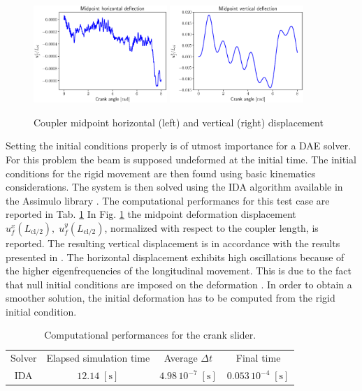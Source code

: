 \documentclass{svjour3}                     %
\newcommand{\secondRev}[1]{\textcolor{blue!80!black}{#1}}
\begin{document}
	
	\begin{figure}[tb]
		\centering
		\includegraphics[width=0.45\textwidth]{uM_disp.eps} 
		\includegraphics[width=0.45\textwidth]{wM_disp.eps} 
		\caption{Coupler midpoint horizontal (left) and vertical (right) displacement}
		\label{fig:defM_crsl}
	\end{figure}
	
	Setting the initial conditions properly is of utmost  importance for a DAE solver. For this problem the beam is supposed undeformed at the initial time. The initial conditions for the rigid movement are then found using basic kinematics considerations.  The system is then solved using the IDA algorithm available in the Assimulo library \cite{assimulo}. \secondRev{The computational performancs for this test case are reported in Tab. \ref{tab:comp_perf_crslider}} In Fig. \ref{fig:defM_crsl} the midpoint deformation displacement $u_f^x(L_{\text{cl}/2}),\; u_f^y(L_{\text{cl}/2})$, normalized with respect to the coupler length, is reported. The resulting vertical displacement is in accordance with the results presented in \cite{Ellenbroek2018}. The horizontal displacement exhibits high oscillations because of the higher eigenfrequencies of the longitudinal movement. This is due to the fact that null initial conditions are imposed on the deformation \cite{MB_Daepde}. In order to obtain a smoother solution, the initial deformation has to be computed from the rigid initial condition.
	
	
	\begin{table}[tb]
		\centering
		\caption{\secondRev{Computational performances for the crank slider.}}
		\label{tab:comp_perf_crslider}       %
		\begin{tabular}{cccc}
			\hline\noalign{\smallskip}
			Solver & Elapsed simulation time & Average $\Delta t$ & Final time \\
			\noalign{\smallskip}\hline\noalign{\smallskip}
			IDA & $12.14\; \mathrm{[s]}$ & $4.98 \, 10^{-7} \; \mathrm{[s]}$ & $0.053 \, 10^{-4} \; \mathrm{[s]}$\\
			\hline
		\end{tabular}
	\end{table}
	
\end{document}
